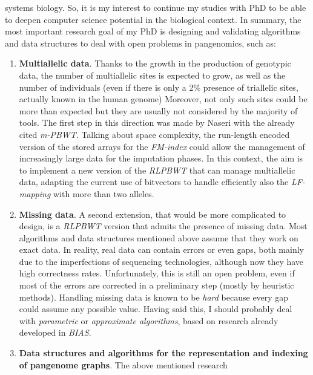 \documentclass[a4paper,11pt, oneside]{article}
\newcommand{\pb}[1]{\todo[backgroundcolor=red]{\textbf{PB} #1}}
\begin{document}
systems biology. So, it is my interest to continue my studies with PhD
to be able to deepen computer science potential in the biological
context.
In summary, the most important research goal of my PhD is designing and
validating algorithms and data structures to deal with open problems in
pangenomics, such as: 
\vspace{-1.25mm}
\begin{enumerate}[leftmargin=.2in]
  \setlength\itemsep{-0.2em}
  \item \textbf{Multiallelic data}. Thanks to the growth in the
  production of genotypic data, the number of multiallelic sites is expected to
  grow, as well as the number of individuals (even if there is only a 2\%
  presence of triallelic sites, actually known in the human genome)
  Moreover, not only 
  such sites could be more than expected but they are 
  usually not considered by the majority of tools. The first step in this
  direction was made 
  by Naseri with the already cited \textit{m-PBWT}.
  Talking about space complexity, the run-length encoded version of the stored
  arrays for the \textit{FM-index} could allow the management of increasingly
  large data for the imputation phases.   
  In this context, the aim is to implement a new 
  version of the \textit{RLPBWT} that can manage multiallelic data, adapting the
  current use of bitvectors to handle efficiently also the \textit{LF-mapping}
  with more than two alleles. 
  \item \textbf{Missing data}. A second extension, that would be more
  complicated to 
  design, is a \textit{RLPBWT} version that admits the presence of
  missing data. Most algorithms and data structures mentioned above assume that
  they work on exact data. In reality, real data can contain errors or even
  gaps, both mainly due to the imperfections of sequencing technologies,
  although now they have high correctness rates. Unfortunately, this is
  still an open problem, even if most of the errors are corrected in a
  preliminary step (mostly by heuristic methods).
  Handling missing data is known to be \textit{hard} because every gap could
  assume any possible value. Having said this, I should  
  probably deal with \textit{parametric} or \textit{approximate algorithms},
  based on research already developed in \textit{BIAS}.
  \item \textbf{Data structures and algorithms for the representation and
    indexing  of pangenome graphs}. The above mentioned research 

\end{enumerate}
\end{document}
